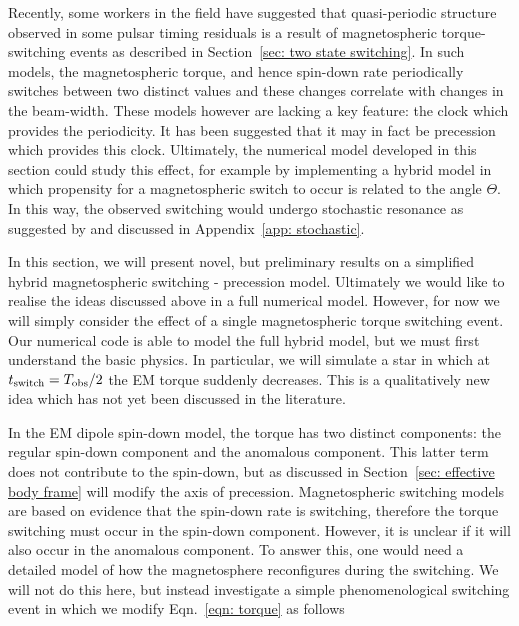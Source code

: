 \documentclass[../full_thesis/full_thesis.tex]{subfiles}
\begin{document}
Recently, some workers in the field \citep{Lyne2010, Perera2015} have suggested
that quasi-periodic structure observed in some pulsar timing residuals is a
result of magnetospheric torque-switching events as described in
Section~\ref{sec: two state switching}. In such models, the magnetospheric
torque, and hence spin-down rate periodically switches between two distinct
values and these changes correlate with changes in the beam-width.  These
models however are lacking a key feature: the clock which provides the
periodicity. It has been suggested \citep{Jones2012} that it may in fact be
precession which provides this clock. Ultimately, the numerical model developed
in this section could study this effect, for example by implementing a hybrid
model in which propensity for a magnetospheric switch to occur is related to
the angle $\Theta$. In this way, the observed switching would undergo
stochastic resonance as suggested by \citet{Cordes2013} and discussed in
Appendix~\ref{app: stochastic}.

In this section, we will present novel, but preliminary results on a simplified
hybrid magnetospheric switching - precession model. Ultimately we would like to
realise the ideas discussed above in a full numerical model. However, for now
we will simply consider the effect of a single magnetospheric torque switching
event. Our numerical code is able to model the full hybrid model, but we must
first understand the basic physics. In particular, we will simulate a star in
which at $t_{\mathrm{switch}} = T_{\mathrm{obs}}/2$ the EM torque suddenly decreases. This is
a qualitatively new idea which has not yet been discussed in the literature.

In the EM dipole spin-down model, the torque has two distinct components: the
regular spin-down component and the anomalous component. This latter term does
not contribute to the spin-down, but as discussed in Section~\ref{sec:
effective body frame} will modify the axis of precession. Magnetospheric
switching models are based on evidence that the spin-down rate is switching,
therefore the torque switching must occur in the spin-down component. However,
it is unclear if it will also occur in the anomalous component. To answer this,
one would need a detailed model of how the magnetosphere reconfigures during the
switching. We will not do this here, but instead investigate a simple
phenomenological switching event in which we modify Eqn.~\eqref{eqn: torque} as
follows

\newcommand{\Ss}{S_{\mathrm{S}}}
\newcommand{\Sa}{S_{\mathrm{A}}}
\end{document}
